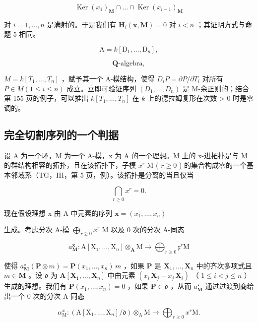 \[
\operatorname{Ker} \left(x _ {1}\right) _ {\mathbf {M}} \cap \dots \cap \operatorname{Ker} \left(x _ {i - 1}\right) _ {\mathbf {M}}
\]

对 \(i = 1, \ldots, n\) 是满射的。于是我们有 \(\mathbf{H}_{i}(\mathbf{x}, \mathbf{M}) = 0\) 对 \(i < n\) ；其证明方式与命题 5 相同。

\[
\mathrm{A} = k \left[ \mathrm{D} _ {1}, \dots , \mathrm{D} _ {n} \right],
\]

\[
\mathbf {Q} \text {-algebra},
\]

\(M = k[T_1, \ldots, T_n]\) ，赋予其一个 A-模结构，使得 \(D_i P = \partial P / \partial T_i\) 对所有 \(P \in M (1 \leqslant i \leqslant n)\) 成立。立即可验证序列 \((D_1, \ldots, D_n)\) 是 M-余正则的；结合第 155 页的例子，可以推出 \(k[T_1, \ldots, T_n]\) 在 \(k\) 上的德拉姆复形在次数 \textgreater{} 0 时是零调的。

\subsection{完全切割序列的一个判据}

设 A 为一个环，M 为一个 A-模，x 为 A 的一个理想。M 上的 x-进拓扑是与 M 的群结构相容的拓扑，且在该拓扑下，子模 \(x^{r}\) M ( \(r \geqslant 0\) ) 的集合构成零的一个基本邻域系（TG，III，第 5 页，例）。该拓扑是分离的当且仅当

\[
\bigcap_ {r \geqslant 0} x ^ {r} = 0.
\]

现在假设理想 x 由 A 中元素的序列 \(\boldsymbol{x}=(x_{1},\ldots,x_{n})\)

生成。考虑分次 A-模 \(\bigoplus_{r\geqslant 0}x^{r}\) M 以及 0 次的分次 A-同态

\[
a _ {\mathbf {M}} ^ {\mathbf {x}}: \mathrm{A} [ \mathrm{X} _ {1}, \dots , \mathrm{X} _ {n} ] \otimes_ {\mathbf {A}} \mathrm{M} \rightarrow \bigoplus_ {r \geqslant 0} \mathfrak {x} ^ {r} \mathrm{M}
\]

使得 \(a_{\mathbf{M}}^{\star}(\mathbf{P} \otimes m) = \mathbf{P}(x_1, \ldots, x_n) \, m\) ，如果 \(\mathbf{P}\) 是 \(\mathbf{X}_1, \ldots, \mathbf{X}_n\) 中的齐次多项式且 \(m \in \mathbf{M}\) 。设 \(\mathfrak{d}\) 为 \(\mathbf{A}[\mathbf{X}_1, \ldots, \mathbf{X}_n]\) 中由元素 \((x_i \, \mathbf{X}_j - x_j \, \mathbf{X}_i)\) （ \(1 \leqslant i < j \leqslant n\) ）生成的理想。我们有 \(\mathbf{P}(x_1, \ldots, x_n) = 0\) ，如果 \(\mathbf{P} \in \mathfrak{d}\) ，从而 \(a_{\mathbf{M}}^{\star}\) 通过过渡到商给出一个 0 次的分次 A-同态

\[
\alpha_ {\mathrm{M}} ^ {x}: \left(\mathrm{A} \left[ \mathrm{X} _ {1}, \dots , \mathrm{X} _ {n} \right] / \mathfrak {d}\right) \otimes_ {\mathrm{A}} \mathrm{M} \rightarrow \bigoplus_ {r \geqslant 0} x ^ {r} \mathrm{M}.
\]

